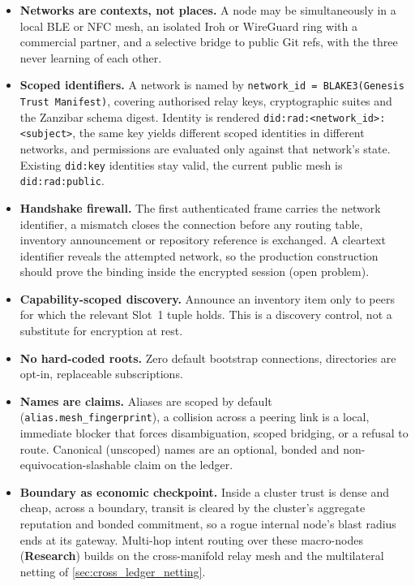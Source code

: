 \documentclass[a4paper,11pt,twoside,parskip=half-,headings=small]{scrartcl}
\newcommand{\stRes}{\textcolor{warn}{\textbf{Research}}}
\newcommand{\code}[1]{\texttt{#1}}
\begin{document}
\begin{itemize}
  \item \textbf{Networks are contexts, not places.} A node may be simultaneously in a local BLE or NFC mesh, an isolated Iroh or
        WireGuard ring with a commercial partner, and a selective bridge to public Git refs, with the three never learning of each other.
  \item \textbf{Scoped identifiers.} A network is named by \code{network\_id = BLAKE3(Genesis Trust Manifest)}, covering authorised relay
        keys, cryptographic suites and the Zanzibar schema digest. Identity is rendered \code{did:rad:<network\_id>:<subject>}, the same key yields
        different scoped identities in different networks, and permissions are evaluated only against that network's state. Existing
        \code{did:key} identities stay valid, the current public mesh is \code{did:rad:public}.
  \item \textbf{Handshake firewall.} The first authenticated frame carries the network identifier, a mismatch closes the connection
        before any routing table, inventory announcement or repository reference is exchanged. A cleartext identifier reveals the attempted network,
        so the production construction should prove the binding inside the encrypted session (open problem).
  \item \textbf{Capability-scoped discovery.} Announce an inventory item only to peers for which the relevant Slot~1 tuple holds. This is a
        discovery control, not a substitute for encryption at rest.
  \item \textbf{No hard-coded roots.} Zero default bootstrap connections, directories are opt-in, replaceable subscriptions.
  \item \textbf{Names are claims.} Aliases are scoped by default (\code{alias.mesh\_fingerprint}), a collision across a peering link is a local,
        immediate blocker that forces disambiguation, scoped bridging, or a refusal to route. Canonical (unscoped) names are an optional,
        bonded and non-equivocation-slashable claim on the ledger.
  \item \textbf{Boundary as economic checkpoint.} Inside a cluster trust is dense and cheap, across a boundary, transit is cleared by the cluster's
        aggregate reputation and bonded commitment, so a rogue internal node's blast radius ends at its gateway. Multi-hop intent routing over
        these macro-nodes (\stRes{}) builds on the cross-manifold relay mesh and the multilateral netting of \cref{sec:cross_ledger_netting}.
\end{itemize}
\end{document}
